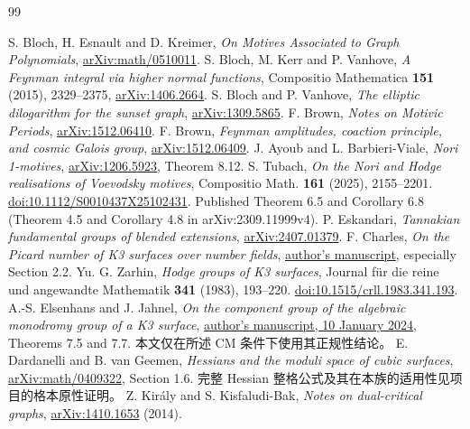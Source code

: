 \documentclass[11pt,a4paper,oneside]{ctexart}
\theoremstyle{cnplain}
\theoremstyle{definition}
\theoremstyle{remark}
\numberwithin{equation}{section}
\begin{document}
\endgroup

\begin{thebibliography}{99}
 S. Bloch, H. Esnault and D. Kreimer, \emph{On Motives Associated to Graph Polynomials}, \href{https://arxiv.org/abs/math/0510011}{arXiv:math/0510011}.
 S. Bloch, M. Kerr and P. Vanhove, \emph{A Feynman integral via higher normal functions}, Compositio Mathematica \textbf{151} (2015), 2329--2375, \href{https://arxiv.org/abs/1406.2664}{arXiv:1406.2664}.
 S. Bloch and P. Vanhove, \emph{The elliptic dilogarithm for the sunset graph}, \href{https://arxiv.org/abs/1309.5865}{arXiv:1309.5865}.
 F. Brown, \emph{Notes on Motivic Periods}, \href{https://arxiv.org/abs/1512.06410}{arXiv:1512.06410}.
 F. Brown, \emph{Feynman amplitudes, coaction principle, and cosmic Galois group}, \href{https://arxiv.org/abs/1512.06409}{arXiv:1512.06409}.
 J. Ayoub and L. Barbieri-Viale, \emph{Nori 1-motives}, \href{https://arxiv.org/abs/1206.5923}{arXiv:1206.5923}, Theorem 8.12.
 S. Tubach, \emph{On the Nori and Hodge realisations of Voevodsky motives},
Compositio Math. \textbf{161} (2025), 2155--2201.
\href{https://doi.org/10.1112/S0010437X25102431}{doi:10.1112/S0010437X25102431}.
Published Theorem 6.5 and Corollary 6.8 (Theorem 4.5 and Corollary 4.8 in arXiv:2309.11999v4).
 P. Eskandari, \emph{Tannakian fundamental groups of blended extensions}, \href{https://arxiv.org/abs/2407.01379}{arXiv:2407.01379}.
 F. Charles, \emph{On the Picard number of K3 surfaces over number fields}, \href{https://www.imo.universite-paris-saclay.fr/~francois.charles/Picard.pdf}{author's manuscript}, especially Section 2.2.
 Yu. G. Zarhin, \emph{Hodge groups of K3 surfaces}, Journal für die reine und angewandte Mathematik \textbf{341} (1983), 193--220. \href{https://doi.org/10.1515/crll.1983.341.193}{doi:10.1515/crll.1983.341.193}.
 A.-S. Elsenhans and J. Jahnel, \emph{On the component group of the algebraic monodromy group of a K3 surface}, \href{https://wwwuser.gwdguser.de/~jjahnel/Arbeiten/Komponentengruppe_v4f.pdf}{author's manuscript, 10 January 2024}, Theorems 7.5 and 7.7. 本文仅在所述 CM 条件下使用其正规性结论。
 E. Dardanelli and B. van Geemen, \emph{Hessians and the moduli space of cubic surfaces}, \href{https://arxiv.org/abs/math/0409322}{arXiv:math/0409322}, Section 1.6. 完整 Hessian 整格公式及其在本族的适用性见项目的格本原性证明。
 Z. Király and S. Kisfaludi-Bak, \emph{Notes on dual-critical graphs}, \href{https://arxiv.org/abs/1410.1653}{arXiv:1410.1653} (2014).

\end{thebibliography}
\end{document}
